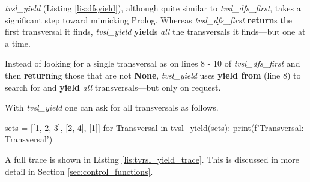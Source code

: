\textit{tvsl\_yield} (Listing \ref{lis:dfsyield}), although quite similar to \textit{tvsl\_dfs\_first}, takes a significant step toward mimicking Prolog. Whereas \textit{tvsl\_dfs\_first} \textbf{return}s the first transversal it finds, \textit{tvsl\_yield} \textbf{yield}s \textit{all} the transversals it finds---but one at a time.  

Instead of looking for a single transversal as on lines 8 - 10 of \textit{tvsl\_dfs\_first} %
and then \textbf{return}ing those that are not \textbf{None}, \textit{tvsl\_yield} uses \textbf{yield from} (line 8) to search for and \textbf{yield} \textit{all} transversals---but only on request.


With \textit{tvsl\_yield} one can ask for all transversals as follows. 

\begin{minipage}{\linewidth} \largev 
\begin{python}
sets = [[1, 2, 3], [2, 4], [1]]
for Transversal in tvsl_yield(sets):
    print(f'Transversal: {Transversal}')
\end{python}
\end{minipage}



A full trace is shown in Listing \ref{lis:tvrsl_yield_trace}. This is discussed in more detail in Section \ref{sec:control_functions}.

